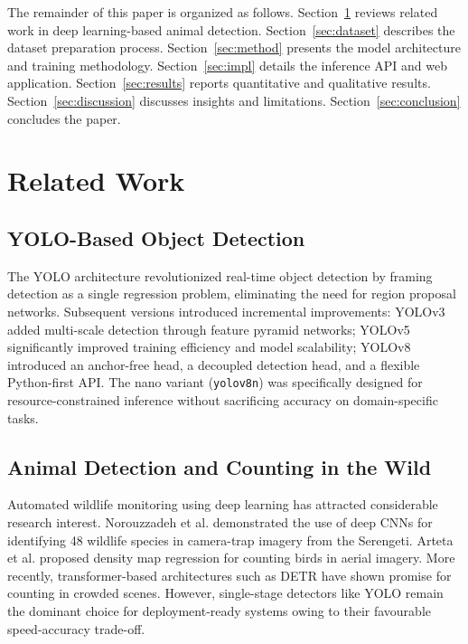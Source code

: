 \documentclass[journal]{IEEEtran}
\begin{document}
The remainder of this paper is organized as follows. Section~\ref{sec:related} reviews related work in deep learning-based animal detection. Section~\ref{sec:dataset} describes the dataset preparation process. Section~\ref{sec:method} presents the model architecture and training methodology. Section~\ref{sec:impl} details the inference API and web application. Section~\ref{sec:results} reports quantitative and qualitative results. Section~\ref{sec:discussion} discusses insights and limitations. Section~\ref{sec:conclusion} concludes the paper.

\section{Related Work}
\label{sec:related}

\subsection{YOLO-Based Object Detection}
The YOLO architecture \cite{redmon2016yolo} revolutionized real-time object detection by framing detection as a single regression problem, eliminating the need for region proposal networks. Subsequent versions introduced incremental improvements: YOLOv3 \cite{yolov3} added multi-scale detection through feature pyramid networks; YOLOv5 significantly improved training efficiency and model scalability; YOLOv8 \cite{yolov8_ultralytics} introduced an anchor-free head, a decoupled detection head, and a flexible Python-first API. The nano variant (\texttt{yolov8n}) was specifically designed for resource-constrained inference without sacrificing accuracy on domain-specific tasks.

\subsection{Animal Detection and Counting in the Wild}
Automated wildlife monitoring using deep learning has attracted considerable research interest. Norouzzadeh et al. \cite{norouzzadeh2018automatically} demonstrated the use of deep CNNs for identifying 48 wildlife species in camera-trap imagery from the Serengeti. Arteta et al. \cite{arteta2016counting} proposed density map regression for counting birds in aerial imagery. More recently, transformer-based architectures such as DETR \cite{carion2020end} have shown promise for counting in crowded scenes. However, single-stage detectors like YOLO remain the dominant choice for deployment-ready systems owing to their favourable speed-accuracy trade-off.
\end{document}
